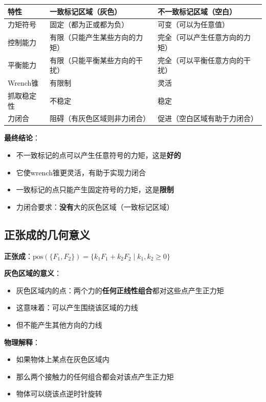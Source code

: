 \documentclass[12pt,a4paper]{article}
\begin{document}
\begin{center}
\begin{tabular}{|l|l|l|}
\hline
\textbf{特性} & \textbf{一致标记区域}（灰色） & \textbf{不一致标记区域}（空白） \\
\hline
力矩符号 & 固定（都为正或都为负） & 可变（可以为任意值） \\
\hline
控制能力 & 有限（只能产生某些方向的力矩） & 完全（可以产生任意方向的力矩） \\
\hline
平衡能力 & 有限（只能平衡某些方向的干扰） & 完全（可以平衡任意方向的干扰） \\
\hline
Wrench锥 & 有限制 & 灵活 \\
\hline
抓取稳定性 & 不稳定 & 稳定 \\
\hline
力闭合 & 阻碍（有灰色区域则非力闭合） & 促进（空白区域有助于力闭合） \\
\hline
\end{tabular}
\end{center}

\textbf{最终结论}：

\begin{itemize}
\item 不一致标记的点可以产生任意符号的力矩，这是\textbf{好的}
\item 它使wrench锥更灵活，有助于实现力闭合
\item 一致标记的点只能产生固定符号的力矩，这是\textbf{限制}
\item 力闭合要求：\textbf{没有}大的灰色区域（一致标记区域）
\end{itemize}

\subsection{正张成的几何意义}

\textbf{正张成}：$\text{pos}(\{F_1, F_2\}) = \{k_1 F_1 + k_2 F_2 \mid k_1, k_2 \geq 0\}$

\textbf{灰色区域的意义}：
\begin{itemize}
\item 灰色区域内的点：两个力的\textbf{任何正线性组合}都对这些点产生正力矩
\item 这意味着：可以产生围绕该区域的力线
\item 但不能产生其他方向的力线
\end{itemize}

\textbf{物理解释}：
\begin{itemize}
\item 如果物体上某点在灰色区域内
\item 那么两个接触力的任何组合都会对该点产生正力矩
\item 物体可以绕该点逆时针旋转
\end{itemize}
\end{document}

